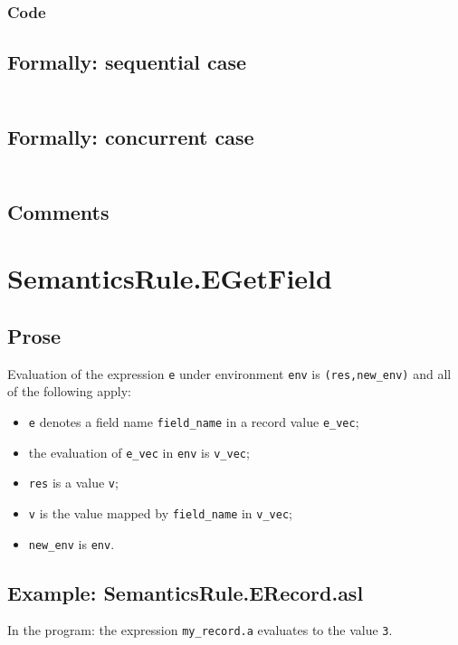 \documentclass{book}
\begin{document}
  \subsubsection{Code}

  \subsection{Formally: sequential case}
  \begin{align}
  \end{align} 

  \subsection{Formally: concurrent case}
  \begin{align}
  \end{align} 

  \subsection{Comments}

\section{SemanticsRule.EGetField \label{sec:SemanticsRule.EGetField}}

  \subsection{Prose}
  Evaluation of the expression \texttt{e} under environment \texttt{env} is
  \texttt{(res,new\_env)} and all of the following apply:
  \begin{itemize}
  \item \texttt{e} denotes a field name \texttt{field\_name} in a record value \texttt{e\_vec};
  \item the evaluation of \texttt{e\_vec} in \texttt{env} is \texttt{v\_vec};
  \item \texttt{res} is a value \texttt{v};
  \item \texttt{v} is the value mapped by \texttt{field\_name} in \texttt{v\_vec};
  \item \texttt{new\_env} is \texttt{env}.
  \end{itemize}

  \subsection{Example: SemanticsRule.ERecord.asl}
    In the program:
    the expression \texttt{my\_record.a} evaluates to the value \texttt{3}.
\end{document}
